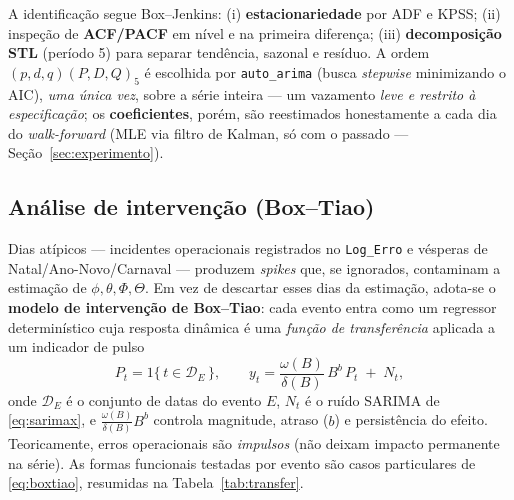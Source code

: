 \documentclass[11pt,a4paper]{article}
\begin{document}
A identificação segue Box--Jenkins: (i) \textbf{estacionariedade} por ADF e KPSS; (ii) inspeção de
\textbf{ACF/PACF} em nível e na primeira diferença; (iii) \textbf{decomposição STL} (período 5)
para separar tendência, sazonal e resíduo. A ordem $(p,d,q)(P,D,Q)_5$ é escolhida por
\texttt{auto\_arima} (busca \emph{stepwise} minimizando o AIC), \emph{uma única vez}, sobre a série
inteira --- um vazamento \emph{leve e restrito à especificação}; os \textbf{coeficientes}, porém,
são reestimados honestamente a cada dia do \emph{walk-forward} (MLE via filtro de Kalman, só com o
passado --- Seção~\ref{sec:experimento}).

\subsection{Análise de intervenção (Box--Tiao)}
\label{sec:interv}

Dias atípicos --- incidentes operacionais registrados no \texttt{Log\_Erro} e vésperas de
Natal/Ano-Novo/Carnaval --- produzem \emph{spikes} que, se ignorados, contaminam a estimação de
$\phi,\theta,\Phi,\Theta$. Em vez de descartar esses dias da estimação, adota-se o \textbf{modelo
de intervenção de Box--Tiao}: cada evento entra como um regressor determinístico cuja resposta
dinâmica é uma \emph{função de transferência} aplicada a um indicador de pulso
\begin{equation}
P_t = 1\{\,t \in \mathcal{D}_E\,\},
\qquad
y_t = \frac{\omega(B)}{\delta(B)}\,B^{b}\,P_t \;+\; N_t,
\label{eq:boxtiao}
\end{equation}
onde $\mathcal{D}_E$ é o conjunto de datas do evento $E$, $N_t$ é o ruído SARIMA de
\eqref{eq:sarimax}, e $\tfrac{\omega(B)}{\delta(B)}B^{b}$ controla magnitude, atraso ($b$) e
persistência do efeito. Teoricamente, erros operacionais são \emph{impulsos} (não deixam impacto
permanente na série). As formas funcionais testadas por evento são casos particulares de
\eqref{eq:boxtiao}, resumidas na Tabela~\ref{tab:transfer}.
\end{document}
